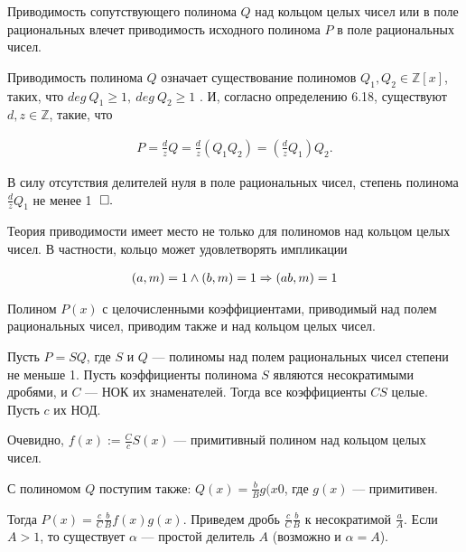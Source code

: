 \documentclass{article}
\begin{document}

\theorem[6.30]

Приводимость сопутствующего полинома $Q$ над кольцом целых чисел
или в поле рациональных влечет приводимость исходного полинома $P$ в поле рациональных чисел.

\proof

Приводимость полинома $Q$ означает существование полиномов
$Q_1, Q_2\in\mathbb{Z} [x]$, таких, что $deg~Q_1\geq 1,~deg~Q_2\geq 1$ . И, согласно определению 6.18, существуют $d, z\in\mathbb{Z}$, такие, что

\begin{align*}
	P=\frac{d}{z} Q=\frac{d}{z} (Q_1 Q_2)=(\frac{d}{z} Q_1) Q_2.
\end{align*}

В силу отсутствия делителей нуля в поле рациональных чисел, степень полинома
$\frac{d}{z} Q_1$ не менее 1 $\qed$ \newline

Теория приводимости имеет место не только для полиномов над кольцом целых чисел.
В частности, кольцо может удовлетворять импликации

\begin{align}
	(a, m)=1\land (b, m)=1 \Rarr (ab, m)=1\label{40:gt}
\end{align}

\theorem[6.32]

Полином $P(x)$ с целочисленными коэффициентами, приводимый над
полем рациональных чисел, приводим также и над кольцом целых чисел.

\proof

Пусть $P=SQ$, где $S$ и $Q$ --- полиномы над полем рациональных
чисел степени не меньше 1.
Пусть коэффициенты полинома $S$ являются несократимыми
дробями, и $C$ --- НОК их знаменателей.
Тогда все коэффициенты $CS$ целые. Пусть $c$ их НОД.\newline

Очевидно, $f(x):=\frac{C}{c} S(x)$ ---  примитивный полином над кольцом целых чисел. \newline

С полиномом $Q$ поступим также: $Q(x)=\frac{b}{B} g(x0$, где $g(x)$ --- примитивен. \newline

Тогда $P(x)=\frac{c}{C} \frac{b}{B} f(x)g(x)$. Приведем дробь $\frac{c}{C} \frac{b}{B}$ к несократимой $\frac{a}{A}$.
Если $A>1$, то существует $\alpha$ --- простой делитель $A$ (возможно и $\alpha =A$). \newline
\end{document}

